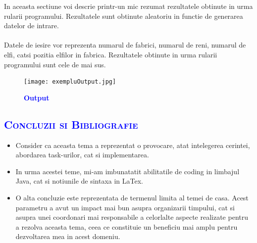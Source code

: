 \documentclass{article}
\begin{document}
In aceasta sectiune voi descrie printr-un mic rezumat rezultatele obtinute in urma rularii programului. Rezultatele sunt obtinute aleatoriu in functie de generarea datelor de intrare.\\\\
Datele de iesire vor reprezenta numarul de fabrici, numarul de reni, numarul de elfi, catsi pozitia elfilor in fabrica. Rezultatele obtinute in urma rularii programului sunt cele de mai sus.
\begin{figure}
      \centering
      \texttt{[image: exempluOutput.jpg]}
      \bfseries\caption{\textbf{\textcolor{blue}{Output}}}
\end{figure}
\newpage 
\begin{center}
    \textcolor{blue}{\section{\bfseries\scshape\textcolor{blue}{Concluzii si Bibliografie}}}
\end{center}
\begin{itemize}
    \item Consider ca aceasta tema a reprezentat o provocare, atat intelegerea cerintei, abordarea task-urilor, cat si implementarea.
    \vspace{2mm}
    \item In urma acestei teme, mi-am imbunatatit abilitatile de coding in limbajul Java, cat si notiunile de sintaxa in LaTex.
    \vspace{2mm}
    \item O alta concluzie este reprezentata de termenul limita al temei de casa. Acest parametru a avut un impact mai bun asupra organizarii timpului, cat si asupra unei coordonari mai responsabile a celorlalte aspecte realizate pentru a rezolva aceasta tema, ceea ce constituie un beneficiu mai amplu pentru dezvoltarea mea in acest domeniu.
       \vspace{2mm}
\end{itemize}
\end{document}

